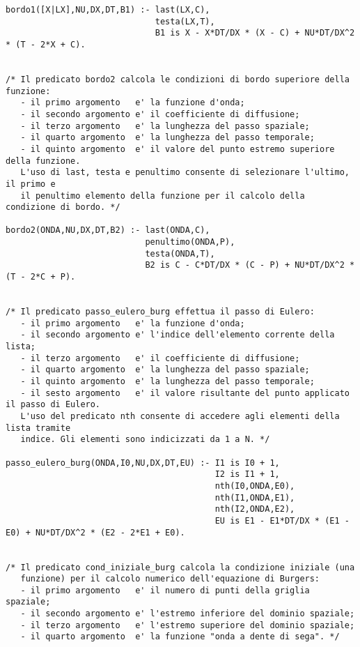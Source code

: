 \begin{verbatim}
bordo1([X|LX],NU,DX,DT,B1) :- last(LX,C),
                              testa(LX,T),
                              B1 is X - X*DT/DX * (X - C) + NU*DT/DX^2 * (T - 2*X + C).


/* Il predicato bordo2 calcola le condizioni di bordo superiore della funzione:
   - il primo argomento   e' la funzione d'onda;
   - il secondo argomento e' il coefficiente di diffusione;
   - il terzo argomento   e' la lunghezza del passo spaziale;
   - il quarto argomento  e' la lunghezza del passo temporale;
   - il quinto argomento  e' il valore del punto estremo superiore della funzione.
   L'uso di last, testa e penultimo consente di selezionare l'ultimo, il primo e
   il penultimo elemento della funzione per il calcolo della condizione di bordo. */

bordo2(ONDA,NU,DX,DT,B2) :- last(ONDA,C),
                            penultimo(ONDA,P),
                            testa(ONDA,T),
                            B2 is C - C*DT/DX * (C - P) + NU*DT/DX^2 * (T - 2*C + P).


/* Il predicato passo_eulero_burg effettua il passo di Eulero:
   - il primo argomento   e' la funzione d'onda;
   - il secondo argomento e' l'indice dell'elemento corrente della lista;
   - il terzo argomento   e' il coefficiente di diffusione;
   - il quarto argomento  e' la lunghezza del passo spaziale;
   - il quinto argomento  e' la lunghezza del passo temporale;
   - il sesto argomento   e' il valore risultante del punto applicato il passo di Eulero.
   L'uso del predicato nth consente di accedere agli elementi della lista tramite
   indice. Gli elementi sono indicizzati da 1 a N. */

passo_eulero_burg(ONDA,I0,NU,DX,DT,EU) :- I1 is I0 + 1,
                                          I2 is I1 + 1,
                                          nth(I0,ONDA,E0),
                                          nth(I1,ONDA,E1),
                                          nth(I2,ONDA,E2),
                                          EU is E1 - E1*DT/DX * (E1 - E0) + NU*DT/DX^2 * (E2 - 2*E1 + E0).


/* Il predicato cond_iniziale_burg calcola la condizione iniziale (una 
   funzione) per il calcolo numerico dell'equazione di Burgers:
   - il primo argomento   e' il numero di punti della griglia spaziale;
   - il secondo argomento e' l'estremo inferiore del dominio spaziale;
   - il terzo argomento   e' l'estremo superiore del dominio spaziale; 
   - il quarto argomento  e' la funzione "onda a dente di sega". */


\end{verbatim}

